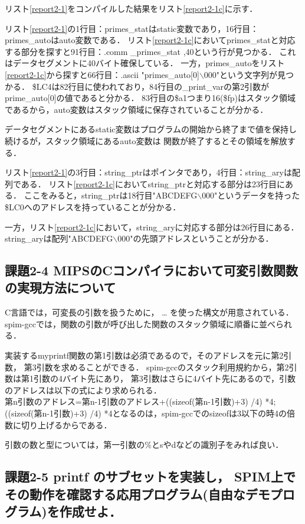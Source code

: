 \documentclass[11pt]{jarticle}
\begin{document}
リスト\ref{report2-1}をコンパイルした結果をリスト\ref{report2-1c}に示す．

リスト\ref{report2-1}の1行目：primes\_statはstatic変数であり，16行目：primes\_autoはauto変数である．
リスト\ref{report2-1c}においてprimes\_statと対応する部分を探すと91行目：.comm \_primes\_stat ,40という行が見つかる．
これはデータセグメントに40バイト確保している．
一方，primes\_autoをリスト\ref{report2-1c}から探すと66行目：.ascii "primes\_auto[0]$\backslash$000"という文字列が見つかる．
\$LC4は82行目に使われており，84行目の\_print\_varの第2引数がprime\_auto[0]の値であると分かる．
83行目の\$a1つまり16(\$fp)はスタック領域であるから，auto変数はスタック領域に保存されていることが分かる．

データセグメントにあるstatic変数はプログラムの開始から終了まで値を保持し続けるが，スタック領域にあるauto変数は
関数が終了するとその領域を解放する．

リスト\ref{report2-1}の3行目：string\_ptrはポインタであり，4行目：string\_aryは配列である．
リスト\ref{report2-1c}においてstring\_ptrと対応する部分は23行目にある．
ここをみると，string\_ptrは18行目"ABCDEFG$\backslash$000"というデータを持った\$LC0へのアドレスを持っていることが分かる．

一方，リスト\ref{report2-1c}において，string\_aryに対応する部分は26行目にある．
string\_aryは配列"ABCDEFG$\backslash$000"の先頭アドレスということが分かる．

\subsection{課題2-4 MIPSのCコンパイラにおいて可変引数関数の実現方法について}

C言語では，可変長の引数を扱うために， … を使った構文が用意されている．
spim-gccでは，関数の引数が呼び出した関数のスタック領域に順番に並べられる．

実装するmyprintf関数の第1引数は必須であるので，そのアドレスを元に第2引数，
第3引数を求めることができる．
spim-gccのスタック利用規約から，第2引数は第1引数の4バイト先にあり，
第3引数はさらに4バイト先にあるので，引数のアドレスは以下の式により求められる．
\\
第n引数のアドレス=第n-1引数のアドレス+((sizeof(第n-1引数)+3) /4) *4;
\\
((sizeof(第n-1引数)+3) /4) *4となるのは，spim-gccでのsizeofは3以下の時4の倍数に切り上げるからである．

引数の数と型については，第一引数の\%とsやdなどの識別子をみれば良い．

\subsection{課題2-5 printf のサブセットを実装し， SPIM上でその動作を確認する応用プログラム(自由なデモプログラム)を作成せよ．} \label{sec:2-5}
\end{document}
